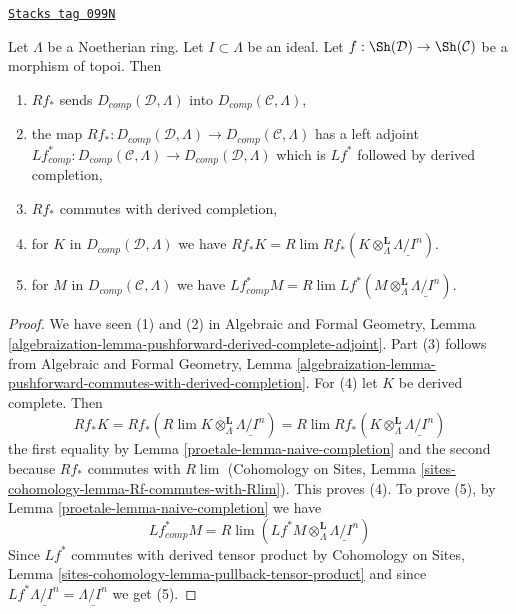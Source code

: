 \begin{lemma}
\label{proetale-lemma-pushforward-Noetherian-case}
\href{https://stacks.math.columbia.edu/tag/099N}{\texttt{Stacks tag 099N}}

Let $\Lambda$ be a Noetherian ring. Let $I \subset \Lambda$ be an ideal.
Let $f : \Sh(\mathcal{D}) \to \Sh(\mathcal{C})$ be a morphism of topoi.
Then
\begin{enumerate}
\item $Rf_*$ sends $D_{comp}(\mathcal{D}, \Lambda)$
into $D_{comp}(\mathcal{C}, \Lambda)$,
\item the map $Rf_* : D_{comp}(\mathcal{D}, \Lambda) \to
D_{comp}(\mathcal{C}, \Lambda)$ has a left adjoint
$Lf_{comp}^* : D_{comp}(\mathcal{C}, \Lambda) \to
D_{comp}(\mathcal{D}, \Lambda)$ which is $Lf^*$ followed by
derived completion,
\item $Rf_*$ commutes with derived completion,
\item for $K$ in $D_{comp}(\mathcal{D}, \Lambda)$ we have
$Rf_*K = R\lim Rf_*(K \otimes^\mathbf{L}_\Lambda \underline{\Lambda/I^n})$.
\item for $M$ in $D_{comp}(\mathcal{C}, \Lambda)$ we have
$Lf^*_{comp}M =
R\lim Lf^*(M \otimes^\mathbf{L}_\Lambda \underline{\Lambda/I^n})$.
\end{enumerate}
\end{lemma}

\begin{proof}

We have seen (1) and (2) in
Algebraic and Formal Geometry, Lemma
\ref{algebraization-lemma-pushforward-derived-complete-adjoint}.
Part (3) follows from
Algebraic and Formal Geometry, Lemma
\ref{algebraization-lemma-pushforward-commutes-with-derived-completion}.
For (4) let $K$ be derived complete. Then
$$
Rf_*K = Rf_*( R\lim K \otimes^\mathbf{L}_\Lambda \underline{\Lambda/I^n}) =
R\lim Rf_*(K \otimes^\mathbf{L}_\Lambda \underline{\Lambda/I^n})
$$
the first equality by Lemma \ref{proetale-lemma-naive-completion}
and the second because $Rf_*$ commutes with $R\lim$
(Cohomology on Sites, Lemma
\ref{sites-cohomology-lemma-Rf-commutes-with-Rlim}). This proves (4).
To prove (5), by Lemma \ref{proetale-lemma-naive-completion} we have
$$
Lf_{comp}^*M =
R\lim ( Lf^*M \otimes_\Lambda^\mathbf{L} \underline{\Lambda/I^n})
$$
Since $Lf^*$ commutes with derived tensor product by
Cohomology on Sites, Lemma \ref{sites-cohomology-lemma-pullback-tensor-product}
and since $Lf^*\underline{\Lambda/I^n} = \underline{\Lambda/I^n}$
we get (5).
\end{proof}

